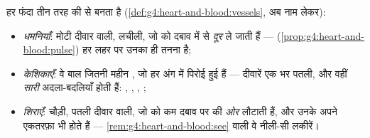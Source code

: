\begin{definition}[धमनियाँ, केशिकाएँ, शिराएँ]\label{def:g7:heart-and-circulation:vessels}
हर फंदा तीन तरह की  से बनता है
(\cref{def:g4:heart-and-blood:vessels}, अब नाम लेकर):
\begin{itemize}
  \item \emph{धमनियाँ}: मोटी दीवार वाली,
        लचीली, जो  को दबाव में  से \emph{दूर} ले
        जाती हैं --- 
        (\cref{prop:g4:heart-and-blood:pulse}) हर लहर पर उनका
        ही तनना है;
  \item \emph{केशिकाएँ}: वे
        बाल जितनी महीन , जो हर अंग में पिरोई हुई हैं ---
        दीवारें एक  भर पतली, और वहीं \emph{सारी}
        अदला-बदलियाँ होती हैं: , , , ;
  \item \emph{शिराएँ}: चौड़ी, पतली दीवार वाली,
        जो  को कम दबाव पर  की \emph{ओर} लौटाती हैं, और
        उनके अपने एकतरफ़ा  भी होते हैं ---
        \cref{rem:g4:heart-and-blood:see} वाली वे नीली-सी लकीरें।
\end{itemize}
\end{definition}

